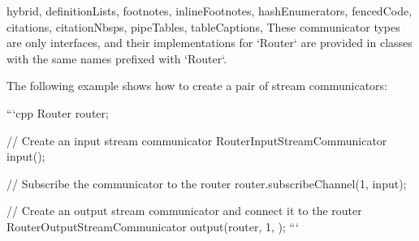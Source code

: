 \begin{markdown*}{%
  hybrid,
  definitionLists,
  footnotes,
  inlineFootnotes,
  hashEnumerators,
  fencedCode,
  citations,
  citationNbsps,
  pipeTables,
  tableCaptions,
}
These communicator types are only interfaces, and their implementations for `Router` are provided in classes with the same names prefixed with `Router`.

The following example shows how to create a pair of stream communicators:

```cpp
Router router;

// Create an input stream communicator
RouterInputStreamCommunicator input({});

// Subscribe the communicator to the router
router.subscribeChannel(1, input);

// Create an output stream communicator and connect it to the router
RouterOutputStreamCommunicator output(router, 1, {});
```


\end{markdown*}
